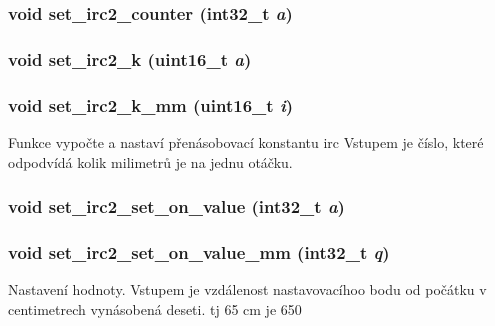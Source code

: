 \subsubsection[{set\_\-irc2\_\-counter}]{\setlength{\rightskip}{0pt plus 5cm}void set\_\-irc2\_\-counter (int32\_\-t {\em a})}\label{irc2_8h_abe8163b2ba712f1a83891ce75e903037}
\subsubsection[{set\_\-irc2\_\-k}]{\setlength{\rightskip}{0pt plus 5cm}void set\_\-irc2\_\-k (uint16\_\-t {\em a})}\label{irc2_8h_aca073e77760684114a3d1f46adef8efc}
\subsubsection[{set\_\-irc2\_\-k\_\-mm}]{\setlength{\rightskip}{0pt plus 5cm}void set\_\-irc2\_\-k\_\-mm (uint16\_\-t {\em i})}\label{irc2_8h_a06a421e66d3fa4bc4991b708986beb49}
Funkce vypočte a nastaví přenásobovací konstantu irc Vstupem je číslo, které odpodvídá kolik milimetrů je na jednu otáčku. 
\subsubsection[{set\_\-irc2\_\-set\_\-on\_\-value}]{\setlength{\rightskip}{0pt plus 5cm}void set\_\-irc2\_\-set\_\-on\_\-value (int32\_\-t {\em a})}\label{irc2_8h_a41a0bca6c07f8b1245a4b59a8209fce9}
\subsubsection[{set\_\-irc2\_\-set\_\-on\_\-value\_\-mm}]{\setlength{\rightskip}{0pt plus 5cm}void set\_\-irc2\_\-set\_\-on\_\-value\_\-mm (int32\_\-t {\em q})}\label{irc2_8h_a9d85c077b39fc2e091d54dcbfff72608}
Nastavení hodnoty. Vstupem je vzdálenost nastavovacíhoo bodu od počátku v centimetrech vynásobená deseti. tj 65 cm je 650 